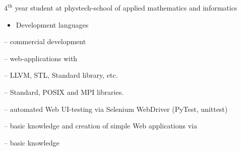 \documentclass[10pt,a4paper,ragged2e,withhyper]{custom-altacv}
\begin{document}
\begin{paracol}{2}


\fi



\switchcolumn


$4^\text{th}$ year student at phystech-school of applied mathematics and informatics

\iffalse
\divider

\cvevent{\faSchool \hspace{.1ex} Secondary Eduation}{LORD lyceum}{September 2009 -- June 2020}{}
Graduated with honors
\fi




\begin{itemize}
	\item \textcolor{emphasis}{Development languages}
\end{itemize}

 -- commercial development
\vspace{1ex}

 -- web-applications with 
\vspace{1ex}

 -- LLVM, STL, Standard library, etc.
\vspace{1ex}

 -- Standard, POSIX and MPI libraries.
\vspace{1ex}

 -- automated Web UI-testing via Selenium WebDriver (PyTest, unittest)
\vspace{1ex}

 -- basic knowledge and creation of simple Web applications via 

 -- basic knowledge
\vspace{.5ex}


\end{paracol}
\end{document}

